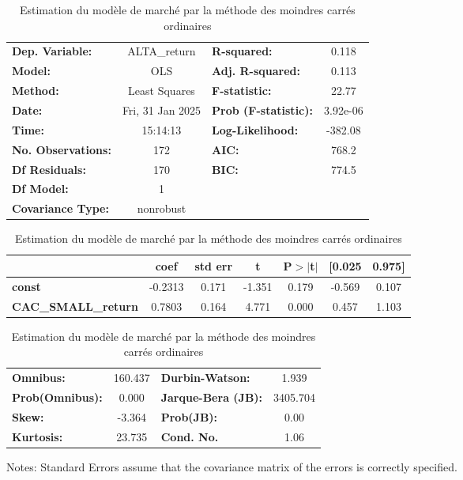\documentclass[a4paper, 12pt]{report}
\begin{document}
\begin{table}[H]
		\begin{tabular}{lclc}
			\toprule
			\textbf{Dep. Variable:}     &   ALTA\_return   & \textbf{  R-squared:         } &     0.118   \\
			\textbf{Model:}             &       OLS        & \textbf{  Adj. R-squared:    } &     0.113   \\
			\textbf{Method:}            &  Least Squares   & \textbf{  F-statistic:       } &     22.77   \\
			\textbf{Date:}              & Fri, 31 Jan 2025 & \textbf{  Prob (F-statistic):} &  3.92e-06   \\
			\textbf{Time:}              &     15:14:13     & \textbf{  Log-Likelihood:    } &   -382.08   \\
			\textbf{No. Observations:}  &         172      & \textbf{  AIC:               } &     768.2   \\
			\textbf{Df Residuals:}      &         170      & \textbf{  BIC:               } &     774.5   \\
			\textbf{Df Model:}          &           1      & \textbf{                     } &             \\
			\textbf{Covariance Type:}   &    nonrobust     & \textbf{                     } &             \\
		\end{tabular}
		\begin{tabular}{lcccccc}
			\toprule
			& \textbf{coef} & \textbf{std err} & \textbf{t} & \textbf{P$> |$t$|$} & \textbf{[0.025} & \textbf{0.975]}\\
			\midrule
			\textbf{const}              &      -0.2313  &        0.171     &    -1.351  &         0.179        &       -0.569    &        0.107     \\
			\textbf{CAC\_SMALL\_return} &       0.7803  &        0.164     &     4.771  &         0.000        &        0.457    &        1.103     \\
			\bottomrule
		\end{tabular}
		\begin{tabular}{lclc}
			\textbf{Omnibus:}       & 160.437 & \textbf{  Durbin-Watson:     } &    1.939  \\
			\textbf{Prob(Omnibus):} &   0.000 & \textbf{  Jarque-Bera (JB):  } & 3405.704  \\
			\textbf{Skew:}          &  -3.364 & \textbf{  Prob(JB):          } &     0.00  \\
			\textbf{Kurtosis:}      &  23.735 & \textbf{  Cond. No.          } &     1.06  \\
			\bottomrule
		\end{tabular}
	
	Notes: \newline
	[1] Standard Errors assume that the covariance matrix of the errors is correctly specified.
	\caption{Estimation du modèle de marché par la méthode des moindres carrés ordinaires}
	
\end{table}
\end{document}
